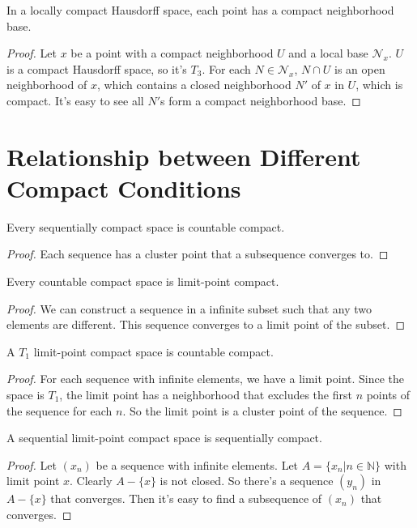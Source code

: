 \documentclass[12pt]{book}
\begin{document}
\begin{theorem}
	In a locally compact Hausdorff space, each point has a compact neighborhood base.
\end{theorem}
\begin{proof}
	Let $x$ be a point with a compact neighborhood $U$ and a local base $\mathcal N_x$. $U$ is a compact Hausdorff space, so it's $T_3$. For each $N\in \mathcal N_x$, $N\cap U$ is an open neighborhood of $x$, which contains a closed neighborhood $N'$ of $x$ in $U$, which is compact. It's easy to see all $N'$s form a compact neighborhood base.
\end{proof}

\section{Relationship between Different Compact Conditions}

\begin{theorem}
	Every sequentially compact space is countable compact.
\end{theorem}
\begin{proof}
	Each sequence has a cluster point that a subsequence converges to.
\end{proof}

\begin{theorem}
	Every countable compact space is limit-point compact.
\end{theorem}
\begin{proof}
	We can construct a sequence in a infinite subset such that any two elements are different. This sequence converges to a limit point of the subset.
\end{proof}

\begin{theorem}
	A $T_1$ limit-point compact space is countable compact.
\end{theorem}
\begin{proof}
	For each sequence with infinite elements, we have a limit point. Since the space is $T_1$, the limit point has a neighborhood that excludes the first $n$ points of the sequence for each $n$. So the limit point is a cluster point of the sequence.
\end{proof}

\begin{theorem}
	A sequential limit-point compact space is sequentially compact.
\end{theorem}
\begin{proof}
	Let $(x_n)$ be a sequence with infinite elements. Let $A=\{x_n|n\in \mathbb N\}$ with limit point $x$. Clearly $A-\{x\}$ is not closed. So there's a sequence $(y_n)$ in $A-\{x\}$ that converges. Then it's easy to find a subsequence of $(x_n)$ that converges.
\end{proof}
\end{document}
